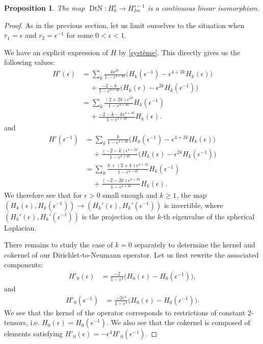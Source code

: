 \documentclass[12pt]{article}
\newtheorem{prop}[thm]{Proposition}
\begin{document}
    \begin{prop}\label{inverse DtN}
        The map $\operatorname{DtN}: H^s_{0}\to H^{s-1}_{Im}$ is a continuous linear isomorphism.
    \end{prop}
    \begin{proof}
        As in the previous section, let us limit ourselves to the situation when $r_1 = \epsilon$ and $r_2 = \epsilon^{-1}$ for some $0<\epsilon<1$.
        
        We have an explicit expression of $H$ by \eqref{système}. This directly gives us the following values:
        \begin{align*}
            H'(\epsilon) &=\sum_k\frac{k\epsilon^{2k}}{1-\epsilon^{4+4k}}\big(H_{k}(\epsilon^{-1}) -\epsilon^{4+2k}H_{k}(\epsilon) \big)\\
            &\;\;\;\;+\frac{-2-k}{1-\epsilon^{4+4k}}\big(H_{k}(\epsilon) - \epsilon^{2k} H_{k}(\epsilon^{-1})\big)\\
            &=\sum_k\frac{(2+2k)\epsilon^{2k}}{1-\epsilon^{4+4k}}H_{k}(\epsilon^{-1})\\
            &\;\;\;\;+\frac{-2-k-k\epsilon^{4+4k}}{1-\epsilon^{4+4k}}H_{k}(\epsilon).
        \end{align*}
        and
        \begin{align*}
            H'(\epsilon^{-1}) &=\sum_k\frac{k}{1-\epsilon^{4+4k}}\big(H_{k}(\epsilon^{-1}) -\epsilon^{4+2k}H_{k}(\epsilon) \big)\\
            &\;\;\;\;+\frac{(-2-k)\epsilon^{4+2k}}{1-\epsilon^{4+4k}}\big(H_{k}(\epsilon) - \epsilon^{2k} H_{k}(\epsilon^{-1})\big)\\
            &=\sum_k\frac{k+(2+k)\epsilon^{4+4k}}{1-\epsilon^{4+4k}}H_{k}(\epsilon^{-1})\\
            &\;\;\;\;+\frac{(-2-2k)\epsilon^{4+2k}}{1-\epsilon^{4+4k}}H_{k}(\epsilon).
        \end{align*}
        We therefore see that for $\epsilon>0$ small enough and $k\geqslant 1$, the map $(H_k(\epsilon),H_k(\epsilon^{-1}))\to (H_k'(\epsilon),H_k'(\epsilon^{-1}))$ is invertible, where $(H_k'(\epsilon),H_k'(\epsilon^{-1}))$ is the projection on the $k$-th eigenvalue of the spherical Laplacian.
        
        There remains to study the case of $k=0$ separately to determine the kernel and cokernel of our Dirichlet-to-Neumann operator. Let us first rewrite the associated components:
        \begin{align*}
            H'_0(\epsilon) &=\frac{-2}{1-\epsilon^{4}}\big(H_{0}(\epsilon) - H_{0}(\epsilon^{-1})\big),
        \end{align*}
        and
        \begin{align*}
            H'_0(\epsilon^{-1}) &=\frac{-2\epsilon^{4}}{1-\epsilon^{4}}\big(H_{0}(\epsilon) -  H_{0}(\epsilon^{-1})\big).
        \end{align*}
        We see that the kernel of the operator corresponds to restrictions of constant $2$-tensors, i.e. $H_0(\epsilon) = H_0(\epsilon^{-1})$. We also see that the cokernel is composed of elements satisfying $ H'_0(\epsilon)=-\epsilon^4H'_0(\epsilon^{-1})$.
    \end{proof}
    
\end{document}
